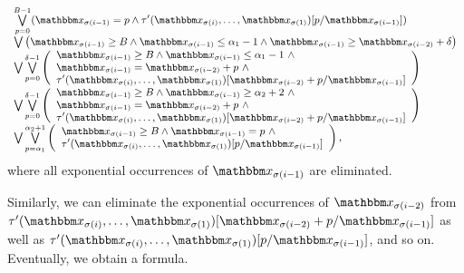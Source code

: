 \[
\small
\begin{array}{l}
\bigvee \limits_{p=0}^{B-1} ( \ivarx_{\sigma(i-1)} = p \wedge \tau'(\ivarx_{\sigma(i)}, \ldots, \ivarx_{\sigma(1)}) [p/\ivarx_{\sigma(i-1)}])   \\
\bigvee \big(\ivarx_{\sigma(i-1)} \ge B \wedge \ivarx_{\sigma(i-1)} \le \alpha_1  - 1  \wedge \ivarx_{\sigma(i-1)} \ge \ivarx_{\sigma(i-2)} +\delta \big)\\
%
\bigvee \bigvee \limits_{p=0}^{\delta-1} 
\left(
\begin{array}{l}
\ivarx_{\sigma(i-1)} \ge B \wedge \ivarx_{\sigma(i-1)} \le \alpha_1  -1 \ \wedge \\
 \ivarx_{\sigma(i-1)} = \ivarx_{\sigma(i-2)} +p\ \wedge\\
 \tau'(\ivarx_{\sigma(i)}, \ldots, \ivarx_{\sigma(1)})[\ivarx_{\sigma(i-2)} + p /\ivarx_{\sigma(i-1)}] 
\end{array}
\right)\\
\bigvee \bigvee \limits_{p=0}^{\delta-1} 
\left(
\begin{array}{l}
\ivarx_{\sigma(i-1)} \ge B \wedge \ivarx_{\sigma(i-1)} \ge \alpha_2 + 2 \ \wedge \\
 \ivarx_{\sigma(i-1)} = \ivarx_{\sigma(i-2)} +p\ \wedge\\
 \tau'(\ivarx_{\sigma(i)}, \ldots, \ivarx_{\sigma(1)})[\ivarx_{\sigma(i-2)} + p /\ivarx_{\sigma(i-1)}] 
\end{array}
\right)\\
\bigvee \bigvee \limits_{p = \alpha_1}^{\alpha_2 + 1}
\left(
\begin{array}{l}
\ivarx_{\sigma(i-1)} \ge B \wedge \ivarx_{\sigma(i-1)} = p\ \wedge \\
 \tau'(\ivarx_{\sigma(i)}, \ldots, \ivarx_{\sigma(1)})[p /\ivarx_{\sigma(i-1)}] 
\end{array}
\right),
\end{array}
\]
where all exponential occurrences of $\ivarx_{\sigma(i-1)}$ are eliminated.

Similarly, we can eliminate the exponential occurrences of $\ivarx_{\sigma(i-2)}$ from $\tau'(\ivarx_{\sigma(i)}, \ldots, \ivarx_{\sigma(1)})[\ivarx_{\sigma(i-2)} + p /\ivarx_{\sigma(i-1)}]$ as well as  $\tau'(\ivarx_{\sigma(i)}, \ldots, \ivarx_{\sigma(1)})[p /\ivarx_{\sigma(i-1)}]$, and so on. Eventually, we obtain a {\pa} formula.




